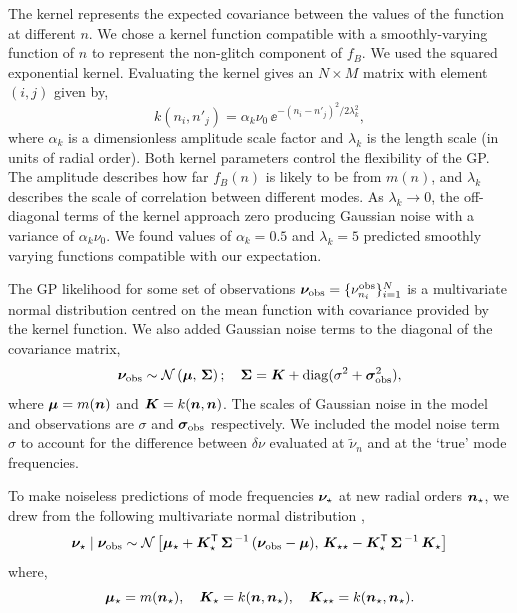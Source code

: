 The kernel represents the expected covariance between the values of the function at different \(n\). We chose a kernel function compatible with a smoothly-varying function of \(n\) to represent the non-glitch component of \(f_B\). We used the squared exponential kernel. Evaluating the kernel gives an \(N \times M\) matrix with element \((i,j)\) given by,
%
\begin{equation}
    k(n_i, n'_j) = \alpha_k \nu_0 \, \ee^{- (n_i - n'_j)^2 / 2\lambda_k^2},
\end{equation}
%
where \(\alpha_k\) is a dimensionless amplitude scale factor and \(\lambda_k\) is the length scale (in units of radial order). Both kernel parameters control the flexibility of the GP. The amplitude describes how far \(f_B(n)\) is likely to be from \(m(n)\), and \(\lambda_k\) describes the scale of correlation between different modes. As \(\lambda_k \rightarrow 0\), the off-diagonal terms of the kernel approach zero producing Gaussian noise with a variance of \(\alpha_k\nu_0\). We found values of \(\alpha_k = 0.5\) and \(\lambda_k = 5\) predicted smoothly varying functions compatible with our expectation. 

The GP likelihood for some set of observations \(\bm{\nu}_{{\mathrm{obs}}} = \{\nu_{n_i}^{{\mathrm{obs}}}\}_{i=1}^N\) is a multivariate normal distribution centred on the mean function with covariance provided by the kernel function. We also added Gaussian noise terms to the diagonal of the covariance matrix,
%
\begin{equation}
    \bm{\nu}_{{\mathrm{obs}}} \sim \mathcal{N}\left( \bm{\mu}, \,  \bm{\Sigma} \right); \quad \bm{\Sigma} = \bm{K} + \mathrm{diag}(\sigma^2 + \bm{\sigma}_{{\mathrm{obs}}}^2), \label{eq:gp-like}
\end{equation}
%
where \(\bm{\mu} = m(\bm{n})\) and \(\bm{K} = k(\bm{n}, \bm{n})\). The scales of Gaussian noise in the model and observations are \(\sigma\) and \(\bm{\sigma}_{{\mathrm{obs}}}\) respectively. We included the model noise term \(\sigma\) to account for the difference between \(\delta\nu\) evaluated at \(\tilde{\nu}_n\) and at the `true' mode frequencies.

To make noiseless predictions of mode frequencies \(\bm{\nu}_\star\) at new radial orders \(\bm{n}_\star\), we drew from the following multivariate normal distribution \citep{Rasmussen.Williams2006},
%
\begin{equation}
    \bm{\nu}_\star \mid \bm{\nu}_{{\mathrm{obs}}} \sim \mathcal{N} \left[ \bm{\mu}_\star + \bm{K}_\star^\mathsf{T} \, \bm{\Sigma}^{\,-1} \, (\bm{\nu}_{{\mathrm{obs}}} - \bm{\mu}), \, \bm{K}_{\star\star} - \bm{K}_\star^\mathsf{T} \, \bm{\Sigma}^{\,-1} \, \bm{K}_\star \right]
\end{equation}
%
where,
%
\begin{equation*}
    \bm{\mu}_\star = m(\bm{n}_\star), \quad \bm{K}_\star = k(\bm{n}, \bm{n}_\star), \quad \bm{K}_{\star\star} = k(\bm{n}_\star, \bm{n}_\star).
\end{equation*}
%

